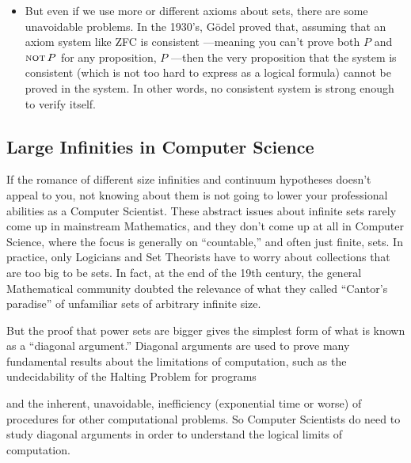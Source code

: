 \begin{itemize}
\item But even if we use more or different axioms about sets, there are
  some unavoidable problems.  In the 1930's, G\"{o}del proved that,
  assuming that an axiom system like ZFC is consistent ---meaning you
  can't prove both $P$ and $\mathop{\mathrm{\textsc{not}}} P$ for any proposition, $P$ ---then the
  very proposition that the system is consistent (which is not too hard to
  express as a logical formula) cannot be proved in the system.  In other
  words, no consistent system is strong enough to verify itself.
  
\end{itemize}

\subsection{Large Infinities in Computer Science}

If the romance of different size infinities and continuum hypotheses
doesn't appeal to you, not knowing about them is not going to lower your
professional abilities as a Computer Scientist.  These abstract issues
about infinite sets rarely come up in mainstream Mathematics, and they
don't come up at all in Computer Science, where the focus is generally on
``countable,'' and often just finite, sets.  In practice, only Logicians
and Set Theorists have to worry about collections that are too big to be
sets.  In fact, at the end of the 19th century, the general Mathematical
community doubted the relevance of what they called ``Cantor's paradise''
of unfamiliar sets of arbitrary infinite size.

But the proof that power sets are bigger gives the simplest form of what
is known as a ``diagonal argument.''  Diagonal arguments are used to prove
many fundamental results about the limitations of computation, such as the
undecidability of the Halting Problem for programs
\iffalse
(a variation of which is given in
\href{http://courses.csail.mit.edu/6.042/spring09/ps2.pdf#unrecognizable.set}
{Pset 2, prob 5})
\fi
and the inherent, unavoidable, inefficiency (exponential
time or worse) of procedures for other computational problems.  So
Computer Scientists do need to study diagonal arguments in order to
understand the logical limits of computation.

\begin{problems}
\classproblems
{}
\end{problems}

